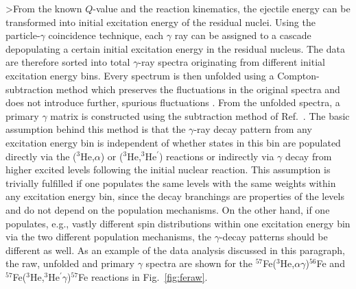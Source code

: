 \begin{multicols}{2}
>From the known $Q$-value and the reaction kinematics, the ejectile energy can 
be transformed into initial excitation energy of the residual nuclei. Using the
particle-$\gamma$ coincidence technique, each $\gamma$ ray can be assigned to a
cascade depopulating a certain initial excitation energy in the residual 
nucleus. The data are therefore sorted into total $\gamma$-ray spectra 
originating from different initial excitation energy bins. Every spectrum is 
then unfolded using a Compton-subtraction method which preserves the 
fluctuations in the original spectra and does not introduce further, spurious 
fluctuations \cite{GT96}. From the unfolded spectra, a primary $\gamma$ matrix
is constructed using the subtraction method of Ref.\ \cite{GR87}. The basic 
assumption behind this method is that the $\gamma$-ray decay pattern from any 
excitation energy bin is independent of whether states in this bin are 
populated directly via the ($^3$He,$\alpha$) or ($^3$He,$^3$He$^\prime$) 
reactions or indirectly via $\gamma$ decay from higher excited levels following
the initial nuclear reaction. This assumption is trivially fulfilled if one 
populates the same levels with the same weights within any excitation energy 
bin, since the decay branchings are properties of the levels and do not depend 
on the population mechanisms. On the other hand, if one populates, e.g., vastly
different spin distributions within one excitation energy bin via the two 
different population mechanisms, the $\gamma$-decay patterns should be 
different as well. As an example of the data analysis discussed in this 
paragraph, the raw, unfolded and primary $\gamma$ spectra are shown for the 
$^{57}$Fe($^3$He,$\alpha\gamma$)$^{56}$Fe and 
$^{57}$Fe($^3$He,$^3$He$^\prime\gamma$)$^{57}$Fe reactions in Fig.\ 
\ref{fig:feraw}.


\end{multicols}
